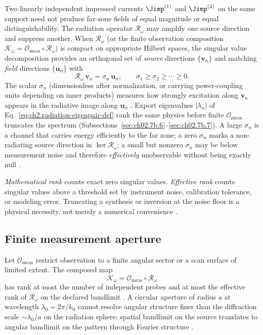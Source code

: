 Two linearly independent impressed currents $\Jimp^{(1)}$ and $\Jimp^{(2)}$ on the same support need not produce far-zone fields of equal magnitude or equal distinguishability. The radiation operator $\mathcal{R}_\omega$ may amplify one source direction and suppress another. When $\mathcal{R}_\omega$ (or the finite observation composition $\mathcal{K}_\omega=\mathcal{O}_{\mathrm{meas}}\circ\mathcal{R}_\omega$) is compact on appropriate Hilbert spaces, the singular value decomposition provides an orthogonal set of \emph{source} directions $\{\mathbf{v}_n\}$ and matching \emph{field} directions $\{\mathbf{u}_n\}$ with
\begin{equation}
\label{eq:ch2.svd-radiation}
\mathcal{R}_\omega\,\mathbf{v}_n=\sigma_n\,\mathbf{u}_n,
\qquad
\sigma_1\ge\sigma_2\ge\cdots\ge0.
\end{equation}
The scalar $\sigma_n$ (dimensionless after normalization, or carrying power-coupling units depending on inner products) measures how strongly excitation along $\mathbf{v}_n$ appears in the radiative image along $\mathbf{u}_n$ \cite{harrington2001}. Export eigenvalues $|\lambda_n|$ of Eq.~\eqref{eq:ch2.radiation-eigenpair-def} rank the same physics before finite $\mathcal{O}_{\mathrm{meas}}$ truncates the spectrum (Subsections~\ref{sec:ch02.7b.6}--\ref{sec:ch02.7b.7}). A large $\sigma_n$ is a channel that carries energy efficiently to the far zone; a zero $\sigma_n$ marks a non-radiating source direction in $\ker\mathcal{R}_\omega$; a small but nonzero $\sigma_n$ may be below measurement noise and therefore \emph{effectively} unobservable without being exactly null \cite{devaney2004}.

\emph{Mathematical rank} counts exact zero singular values. \emph{Effective rank} counts singular values above a threshold set by instrument noise, calibration tolerance, or modeling error. Truncating a synthesis or inversion at the noise floor is a physical necessity, not merely a numerical convenience \cite{hansen1988}.

\subsection{Finite measurement aperture}
\label{sec:ch02.7.2}

Let $\mathcal{O}_{\mathrm{meas}}$ restrict observation to a finite angular sector or a scan surface of limited extent. The composed map
\begin{equation}
\label{eq:ch2.Komega-def}
\mathcal{K}_\omega=\mathcal{O}_{\mathrm{meas}}\circ\mathcal{R}_\omega
\end{equation}
has rank at most the number of independent probes and at most the effective rank of $\mathcal{R}_\omega$ on the declared bandlimit \cite{hansen1988}. A circular aperture of radius $a$ at wavelength $\lambda_0=2\pi/k_0$ cannot resolve angular structure finer than the diffraction scale $\sim\lambda_0/a$ on the radiation sphere: spatial bandlimit on the source translates to angular bandlimit on the pattern through Fourier structure \cite{stratton1941,chu1948}.

